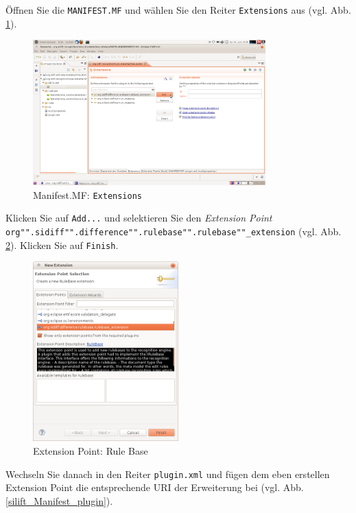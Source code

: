 \documentclass[a4paper]{scrartcl}
\begin{document}
Öffnen Sie die \texttt{MANIFEST.MF} und wählen Sie den Reiter \texttt{Extensions} aus (vgl. Abb. \ref{silift_Manifest_Extensions}). 


\begin{figure}[H]
\centering
\includegraphics[width=0.8\textwidth]{graphics/silift-Manifest_Extensions.png}
\caption{Manifest.MF: \texttt{Extensions}}
\label{silift_Manifest_Extensions}
\end{figure}


Klicken Sie auf \texttt{Add...} und selektieren Sie den \textit{Extension Point} \texttt{org"".sidiff"".difference"".rulebase"".rulebase""\_extension} (vgl. Abb. \ref{silift_Manifest_Extension_Point}). Klicken Sie auf \texttt{Finish}.

\begin{figure}[H]
\centering
\includegraphics[width=0.5\textwidth]{graphics/silift-Manifest_Extension_Point.png}
\caption{Extension Point: Rule Base}
\label{silift_Manifest_Extension_Point}
\end{figure}


Wechseln Sie danach in den Reiter \texttt{plugin.xml} und fügen dem eben erstellen Extension Point die entsprechende URI der Erweiterung bei (vgl. Abb. \ref{silift_Manifest_plugin}).
\end{document}
